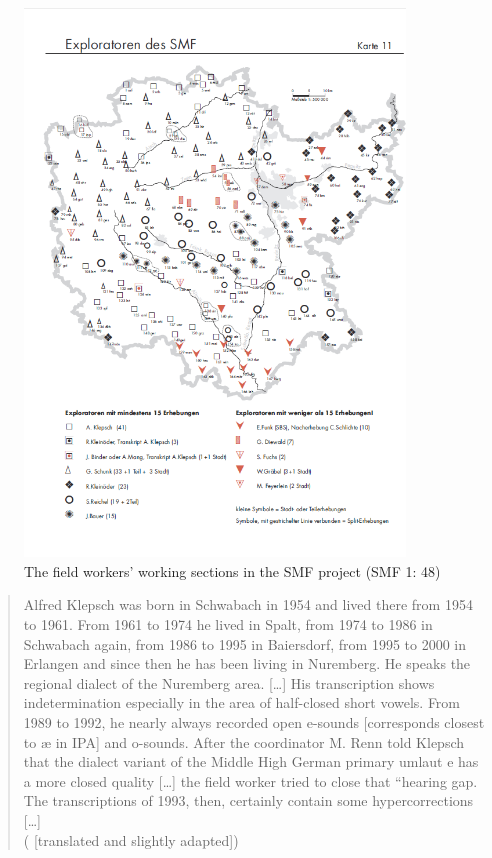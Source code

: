 \documentclass[output=paper]{LSP/langsci}
\begin{document}
\begin{figure}
\includegraphics[width=0.9\textwidth]{illustrations/mathus_fig5}
\caption{The field workers' working sections in the SMF project (SMF 1: 48)}
\label{fig:mathus:5}
\end{figure}


\begin{quote}
Alfred Klepsch was born in Schwabach in 1954 and lived there from 1954 to 1961. From 1961 to 1974 he lived in Spalt, from 1974 to 1986 in Schwabach again, from 1986 to 1995 in Baiersdorf, from 1995 to 2000 in Erlangen and since then he has been living in Nuremberg. He speaks the regional dialect of the Nuremberg area. […] His transcription shows indetermination especially in the area of half-closed short vowels. From 1989 to 1992, he nearly always recorded open e-sounds [corresponds closest to æ in IPA] and o-sounds. After the coordinator M. Renn told Klepsch that the dialect variant of the Middle High German primary umlaut e has a more closed quality […] the field worker tried to close that ``hearing gap{\textquotedbl}. The transcriptions of 1993, then, certainly contain some hypercorrections […]\\(\citealt[47]{klepsch_sprachatlas_2013} [translated and slightly adapted])
\end{quote}
\end{document}

